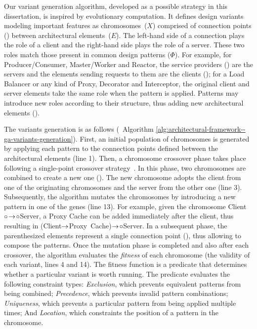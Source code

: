 Our variant generation algorithm, developed as a possible strategy in this dissertation, is inspired by evolutionary computation. It defines design variants modeling important features as chromosomes~(\(X\)) comprised of connection points () between architectural elements~(\(E\)). The left-hand side of a connection plays the role of a client and the right-hand side plays the role of a server. These two roles match those present in common design patterns (\(\Phi\)). For example, for Producer/Consumer, Master/Worker and Reactor, the service providers () are the servers and the elements sending requests to them are the clients (); for a Load Balancer or any kind of Proxy, Decorator and Interceptor, the original client and server elements take the same role when the pattern is applied. Patterns may introduce new roles according to their structure, thus adding new architectural elements ().

The variants generation is as follows (\cf~Algorithm \ref{alg:architectural-framework--ga-variants-generation}). First, an initial population of chromosomes is generated by applying each pattern to the connection points defined between the architectural elements (\cf line 1). Then, a chromosome crossover phase takes place following a single-point crossover strategy~\cite{sivanandam-2008-terminologies}. In this phase, two chromosomes are combined to create a new one (). The new chromosome adopts the client from one of the originating chromosomes and the server from the other one  (\cf line 3). Subsequently, the algorithm mutates the chromosomes by introducing a new pattern in one of the genes  (\cf line 13). For example, given the chromosome \mbox{Client$\circ\!\rightarrow\!\circ$Server}, a Proxy Cache can be added immediately after the client, thus resulting in \mbox{(Client$\rightarrow$Proxy Cache)$\rightarrow\!\circ$Server}. In a subsequent phase, the parenthesized elements represent a single connection point (), thus allowing to compose the patterns. Once the mutation phase is completed and also after each crossover, the algorithm evaluates the \textit{fitness} of each chromosome (\ie the validity of each variant, \cf lines 4 and 14). The fitness function is a predicate that determines whether a particular variant is worth running. The predicate evaluates the following constraint types: \emph{Exclusion}, which prevents equivalent patterns from being combined; \emph{Precedence}, which prevents invalid pattern combinations; \emph{Uniqueness}, which prevents a particular pattern from being applied multiple times; And \emph{Location}, which constraints the position of a pattern in the chromosome.

